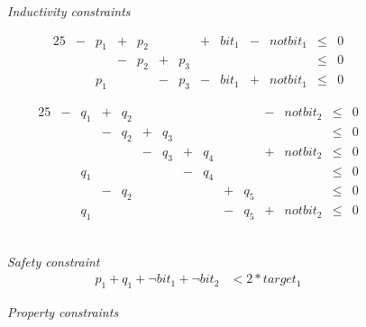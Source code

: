 \begin{figure}[t]
  \begin{minipage}{\columnwidth}
    \emph{Inductivity constraints} \\[-2em]
    \begin{minipage}[t]{.49\columnwidth}
      \centering
      \begin{alignat*}{25}
        &{}-{}& p_1 &{}+{}& p_2 &     &     &{}+{}& bit_1 &{}-{}& notbit_1 &{}\le{}& 0 \\[-0.4em]
        &     &     &{}-{}& p_2 &{}+{}& p_3 &     &       &     &          &{}\le{}& 0 \\[-0.4em]
        &     & p_1 &     &     &{}-{}& p_3 &{}-{}& bit_1 &{}+{}& notbit_1 &{}\le{}& 0
      \end{alignat*}
    \end{minipage}
    \begin{minipage}[t]{.49\columnwidth}
      \centering
      \begin{alignat*}{25}
        &{}-{}& q_1 &{}+{}& q_2 &     &     &     &     &     &     &{}-{}& notbit_2 &{}\le{}& 0  \\[-0.4em]
        &     &     &{}-{}& q_2 &{}+{}& q_3 &     &     &     &     &     &          &{}\le{}& 0  \\[-0.4em]
        &     &     &     &     &{}-{}& q_3 &{}+{}& q_4 &     &     &{}+{}& notbit_2 &{}\le{}& 0  \\[-0.4em]
        &     & q_1 &     &     &     &     &{}-{}& q_4 &     &     &     &          &{}\le{}& 0  \\[-0.4em]
        &     &     &{}-{}& q_2 &     &     &     &     &{}+{}& q_5 &     &          &{}\le{}& 0  \\[-0.4em]
        &     & q_1 &     &     &     &     &     &     &{}-{}& q_5 &{}+{}& notbit_2 &{}\le{}& 0 
      \end{alignat*}
    \end{minipage} \\
    \emph{Safety constraint}\\[-2em]
    \begin{align*}
      p_1 + q_1 + \neg bit_1 + \neg bit_2 & < 2 * target_1
    \end{align*}
  \end{minipage}
  \begin{minipage}{\columnwidth}
    \emph{Property constraints} \\[-2em]
    \begin{minipage}[t]{.49\columnwidth}
      \centering
      \begin{align*}

\end{align*}
\end{minipage}
\end{minipage}
\end{figure}
